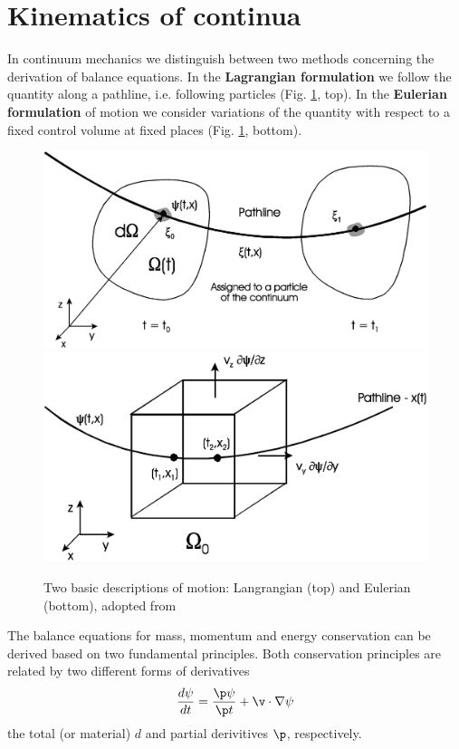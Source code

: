 \section{Kinematics of continua}

In continuum mechanics we distinguish between two methods
concerning the derivation of balance equations. 
In the
\textbf{Lagrangian formulation} we
follow the quantity along a pathline, i.e. following particles
(Fig. \ref{fig:Euler-Langrange}, top). In the \textbf{Eulerian
formulation} of motion we consider
variations of the quantity with respect to a fixed control
volume at fixed places (Fig.
\ref{fig:Euler-Langrange}, bottom).

\begin{figure}[htb!]
\begin{center}
\footnotesize
\includegraphics[width=0.8\columnwidth]{figures/mech1.eps}
\includegraphics[width=0.8\columnwidth]{figures/mech2.eps}
\caption{Two basic descriptions of motion: Langrangian (top) and Eulerian (bottom), adopted from \cite{Kol:02}}
\label{fig:Euler-Langrange}
\end{center}
\end{figure}

The balance equations for mass, momentum and energy conservation can be derived based on two fundamental principles.
%
Both conservation principles are related by two different forms of derivatives
\begin{equation}
\frac{d \psi}{dt}
=
\frac{\p \psi}{\p t} + \v\cdot\nabla\psi
\end{equation}
the total (or material) $d$ and partial derivitives $\p$, respectively.

